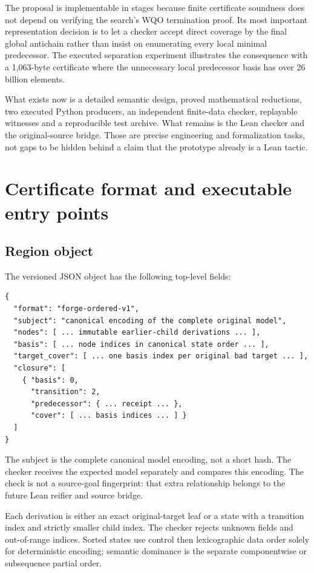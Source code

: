 \documentclass[11pt,a4paper]{article}
\theoremstyle{definition}
\begin{document}
The proposal is implementable in stages because finite certificate soundness
does not depend on verifying the search's WQO termination proof. Its most
important representation decision is to let a checker accept direct coverage
by the final global antichain rather than insist on enumerating every local
minimal predecessor. The executed separation experiment illustrates the
consequence with a 1,063-byte certificate where the unnecessary local
predecessor basis has over 26 billion elements.

What exists now is a detailed semantic design, proved mathematical reductions,
two executed Python producers, an independent finite-data checker, replayable
witnesses and a reproducible test archive. What remains is the Lean checker and
the original-source bridge. Those are precise engineering and formalization
tasks, not gaps to be hidden behind a claim that the prototype already is a
Lean tactic.

\appendix
\section{Certificate format and executable entry points}
\label{app:format}

\subsection{Region object}
The versioned JSON object has the following top-level fields:
\begin{lstlisting}
{
  "format": "forge-ordered-v1",
  "subject": "canonical encoding of the complete original model",
  "nodes": [ ... immutable earlier-child derivations ... ],
  "basis": [ ... node indices in canonical state order ... ],
  "target_cover": [ ... one basis index per original bad target ... ],
  "closure": [
    { "basis": 0,
      "transition": 2,
      "predecessor": { ... receipt ... },
      "cover": [ ... basis indices ... ] }
  ]
}
\end{lstlisting}
The subject is the complete canonical model encoding, not a short hash. The
checker receives the expected model separately and compares this encoding.
The check is not a source-goal fingerprint: that extra relationship belongs
to the future Lean reifier and source bridge.

Each derivation is either an exact original-target leaf or a state with a
transition index and strictly smaller child index. The checker rejects unknown
fields and out-of-range indices. Sorted states use control then lexicographic
data order solely for deterministic encoding; semantic dominance is the
separate componentwise or subsequence partial order.
\end{document}
